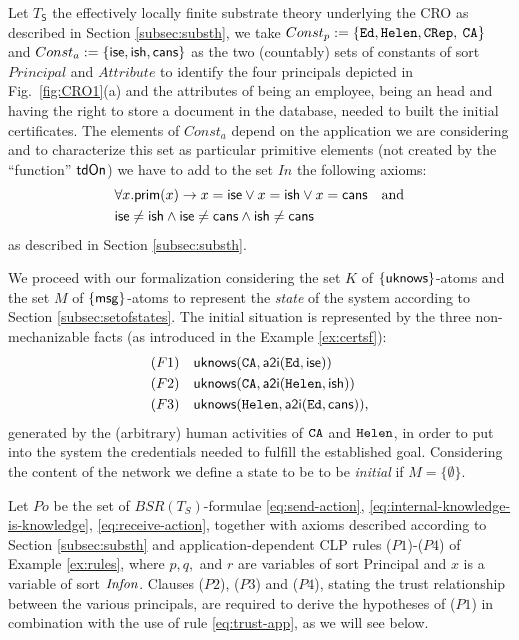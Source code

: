 \documentclass[conference]{llncs}
\newcommand{\theCA}{\ensuremath \mathtt{CA}}
\newcommand{\Ed}{\ensuremath \mathtt{Ed}}
\newcommand{\Helen}{\ensuremath \mathtt{Helen}}
\newcommand{\CRep}{\ensuremath \mathtt{CRep}}
\newcommand{\canstoredoc}{\ensuremath \mathsf{cans}}
\newcommand{\ishead}{\ensuremath \mathsf{ish}}
\newcommand{\isemployee}{\ensuremath \mathsf{ise}}
\newcommand{\msg}{\ensuremath \mathsf{msg}}
\newcommand{\infon}{\ensuremath \mathit{Infon}}
\newcommand{\atoi}{\ensuremath \mathsf{a2i}}
\newcommand{\knowzero}{\ensuremath \mathsf{uknows}}
\newcommand{\tdOn}{\ensuremath \mathsf{tdOn}}
\newcommand{\CRO}{CRO}
\begin{document}
{ Let $T_{\mathsf{S}}$ the effectively locally finite substrate theory underlying the \CRO{} 
as described in Section \ref{subsec:substh}, we take  $Const_{p}:=\{ \Ed, \Helen, \CRep,$ $\theCA\}$ and $Const_{a}:=\{ \isemployee, \ishead, \canstoredoc\}$ as the two (countably) sets of constants of sort $Principal$ and $Attribute$ to identify the four principals depicted in
Fig.~\ref{fig:CRO1}(a) and the attributes of being an employee, being an head and
having the right to store a document in the database, needed to built the initial certificates. 
The elements of $Const_{a}$ depend on the application we are considering and 
to characterize this set as particular primitive elements (not created by the ``function'' $\tdOn$) we have to add to the set $\mathit{In}$ the following axioms:
\begin{align*}
& \forall x. \mathsf{prim}(x) \rightarrow x=\isemployee \vee x=\ishead \vee x=\canstoredoc \quad \text{and}\\
& \isemployee \neq \ishead \wedge \isemployee \neq \canstoredoc \wedge \ishead \neq \canstoredoc
\end{align*}
as described in Section \ref{subsec:substh}.

We proceed with our formalization considering the set $K$ of $\{\knowzero\}$-atoms
and the set $M$ of $\{\msg\}$-atoms to represent the \textit{state} of the system according to Section \ref{subsec:setofstates}.
The initial situation is represented by the three non-mechanizable facts (as introduced in the Example \ref{ex:certsf}): 
\begin{align*}
(F1)\quad & \knowzero(\theCA, \atoi(\Ed,\isemployee)) \\
(F2)\quad & \knowzero(\theCA, \atoi(\Helen,\ishead))\\
(F3)\quad & \knowzero(\Helen, \atoi(\Ed,\canstoredoc)), 
\end{align*}
generated by the (arbitrary) human activities of $\theCA$ and $\Helen$, in order to put into the system the credentials needed to fulfill the established goal.
Considering the content of the network we define a state to be to be \textit{initial} if $M=\{\emptyset\}$.

Let $\mathit{Po}$ be the set of $\mathit{BSR}(T_S)$-formulae \eqref{eq:send-action}, \eqref{eq:internal-knowledge-is-knowledge}, \eqref{eq:receive-action}, together with axioms described according to Section \ref{subsec:substh} and application-dependent CLP rules ($P1$)-($P4$) of Example \ref{ex:rules},
where $p,q,$ and $r$ are variables of sort \mbox{Principal} and $x$ is a
variable of sort $\infon$. 
Clauses ($P2$), ($P3$) and ($P4$), stating the
trust relationship between the various principals, are required to
derive the hypotheses of ($P1$) in combination with the use of rule
\eqref{eq:trust-app}, as we will see below.

}
\end{document}
